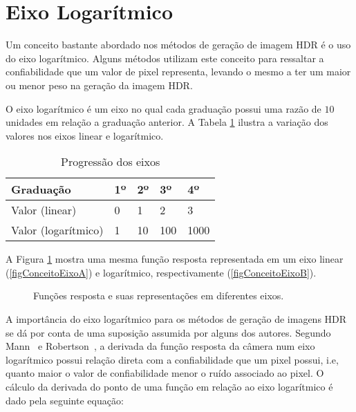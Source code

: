 \section{Eixo Logarítmico} \label{conceitoGaussiana}

	Um conceito bastante abordado nos métodos de geração de imagem HDR é o uso do eixo logarítmico. Alguns métodos utilizam este conceito para ressaltar a confiabilidade que um valor de pixel representa, levando o mesmo a ter um maior ou menor peso na geração da imagem HDR.
	
	O eixo logarítmico é um eixo no qual cada graduação possui uma razão de $10$ unidades em relação a graduação anterior. A Tabela \ref{tabConceitosEixo} ilustra a variação dos valores nos eixos linear e logarítmico.
	
\begin{table}[H]
  \centering
  \caption{Progressão dos eixos}
  \label{tabConceitosEixo}
  \begin{tabular}{l|l|l|l|l}
    \hline
    Graduação           & 1º & 2º & 3º  & 4º   \\
    \hline
    Valor (linear)      & 0  & 1  & 2   & 3    \\
    \hline
    Valor (logarítmico) & 1  & 10 & 100 & 1000 \\  
    \hline
  \end{tabular}
\end{table}
	
	A Figura \ref{figConceitoEixo} mostra uma mesma função resposta representada em um eixo linear (\ref{figConceitoEixoA}) e logarítmico, respectivamente (\ref{figConceitoEixoB}).
	
\begin{figure}[H]
  \centering
  \quad %
  \caption{Funções resposta e suas representações em diferentes eixos.}
  \label{figConceitoEixo}
\end{figure}

	A importância do eixo logarítmico para os métodos de geração de imagens HDR se dá por conta de uma suposição assumida por alguns dos autores. Segundo Mann~\cite{mann} e Robertson~\cite{robertson}, a derivada da função resposta da câmera num eixo logarítmico possui relação direta com a confiabilidade que um pixel possui, i.e, quanto maior o valor de confiabilidade menor o ruído associado ao pixel. O cálculo da derivada do ponto de uma função em relação ao eixo logarítmico é dado pela seguinte equação:
	
